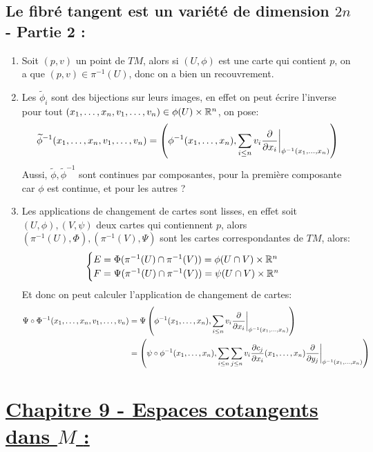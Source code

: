    \subsection*{Le fibré tangent est un variété de dimension \( 2n \) - Partie 2 {:}}
      \begin{enumerate}
         \item Soit \( (p, v) \) un point de \( TM \), alors si \( (U, \phi) \) est une carte qui contient \( p \), on a que \((p, v) \in \pi^{-1}(U)\), donc on a bien un recouvrement.
         \item Les \( \widetilde{\phi}_i \) sont des bijections sur leurs images, en effet on peut écrire l'inverse pour tout \((x_1, \ldots, x_n, v_1, \ldots, v_n) \in \phi(U) \times \mathbb{R}^n \), on pose:
         \[ 
            \widetilde{\phi}^{-1}(x_1, \ldots, x_n, v_1, \ldots, v_n) = \left(\phi^{-1}(x_1, \ldots, x_n), \sum_{i \leq n} v_i\frac{\partial }{\partial x_i}\bigg|_{\phi^{-1}(x_1, \ldots, x_n)}\right)
         \]
         Aussi, \( \widetilde{\phi}, \widetilde{\phi}^{-1} \) sont continues par composantes, pour la première composante car \( \phi \) est continue, et pour les autres ?
         \item Les applications de changement de cartes sont lisses, en effet soit \( (U, \phi), (V, \psi) \) deux cartes qui contiennent \( p \), alors \( (\pi^{-1}(U), \Phi), (\pi^{-1}(V), \Psi) \) sont les cartes correspondantes de \( TM \), alors:
         \[ 
            \begin{cases}
               E = \Phi(\pi^{-1}(U) \cap \pi^{-1}(V)) = \phi(U \cap V) \times \mathbb{R}^n\\
               F = \Psi(\pi^{-1}(U) \cap \pi^{-1}(V)) = \psi(U \cap V) \times \mathbb{R}^n
            \end{cases}
         \]
         Et donc on peut calculer l'application de changement de cartes:
         \begin{align*}
            \Psi \circ \Phi^{-1}(x_1, \ldots, x_n, v_1, \ldots, v_n) 
            &= \Psi\left(\phi^{-1}(x_1, \ldots, x_n), \sum_{i \leq n} v_i \frac{\partial }{\partial x_i}\bigg|_{\phi^{-1}(x_1, \ldots, x_n)} \right)\\ 
            &= \left(\psi \circ \phi^{-1}(x_1, \ldots, x_n), \sum_{i \leq n}\sum_{j \leq n} v_i \frac{\partial c_j}{\partial x_i}(x_1, \ldots, x_n) \frac{\partial }{\partial y_j}\biggr|_{\phi^{-1}(x_1, \ldots, x_n)} \right)
         \end{align*} 
      \end{enumerate}
\section*{\uline{Chapitre 9 - Espaces cotangents dans \( M \) {:}}}
